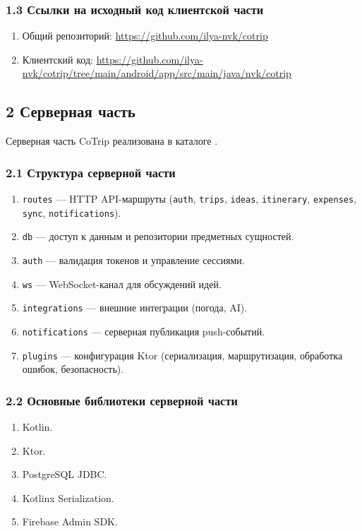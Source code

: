 \documentclass[12pt,a4paper]{article}
\begin{document}
\subsubsection*{1.3 Ссылки на исходный код клиентской части}
\begin{enumerate}
  \item Общий репозиторий: \url{https://github.com/ilya-nvk/cotrip}
  \item Клиентский код: \url{https://github.com/ilya-nvk/cotrip/tree/main/android/app/src/main/java/nvk/cotrip}
\end{enumerate}

\subsection*{2 Серверная часть}
Серверная часть CoTrip реализована в каталоге .

\subsubsection*{2.1 Структура серверной части}
\begin{enumerate}
  \item \texttt{routes} --- HTTP API-маршруты (\texttt{auth}, \texttt{trips}, \texttt{ideas}, \texttt{itinerary}, \texttt{expenses}, \texttt{sync}, \texttt{notifications}).
  \item \texttt{db} --- доступ к данным и репозитории предметных сущностей.
  \item \texttt{auth} --- валидация токенов и управление сессиями.
  \item \texttt{ws} --- WebSocket-канал для обсуждений идей.
  \item \texttt{integrations} --- внешние интеграции (погода, AI).
  \item \texttt{notifications} --- серверная публикация push-событий.
  \item \texttt{plugins} --- конфигурация Ktor (сериализация, маршрутизация, обработка ошибок, безопасность).
\end{enumerate}

\subsubsection*{2.2 Основные библиотеки серверной части}
\begin{enumerate}
  \item Kotlin.
  \item Ktor.
  \item PostgreSQL JDBC.
  \item Kotlinx Serialization.
  \item Firebase Admin SDK.
\end{enumerate}
\end{document}
